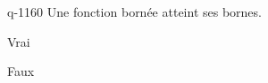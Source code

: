 \begin{truefalse}{q-1160}
Une fonction bornée atteint ses bornes.
\item Vrai
\item* Faux
\end{truefalse}

